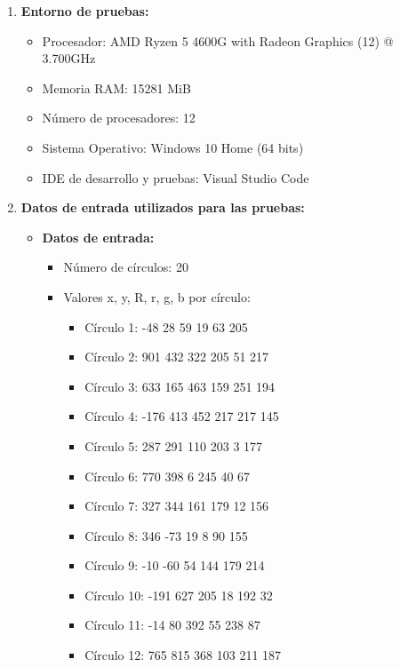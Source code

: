 \documentclass[12pt, letterpaper]{article}
\begin{document}
\begin{flushleft}
\begin{enumerate}
        \vspace{10mm}
        \item \textbf{Entorno de pruebas:}
            \begin{itemize}
                \item Procesador: AMD Ryzen 5 4600G with Radeon Graphics (12) @ 3.700GHz
                \item Memoria RAM: 15281 MiB
                \item Número de procesadores: 12
                \item Sistema Operativo: Windows 10 Home (64 bits)
                \item IDE de desarrollo y pruebas: Visual Studio Code
            \end{itemize}
        \item \textbf{Datos de entrada utilizados para las pruebas:}
            \begin{itemize}
                \item \textbf{Datos de entrada:}
                \begin{itemize}
                    \item Número de círculos: 20
                    \item Valores x, y, R, r, g, b por círculo:
                    \begin{itemize}
                        \item Círculo 1: -48 28 59 19 63 205
                        \item Círculo 2: 901 432 322 205 51 217
                        \item Círculo 3: 633 165 463 159 251 194
                        \item Círculo 4: -176 413 452 217 217 145
                        \item Círculo 5: 287 291 110 203 3 177
                        \item Círculo 6: 770 398 6 245 40 67
                        \item Círculo 7: 327 344 161 179 12 156
                        \item Círculo 8: 346 -73 19 8 90 155
                        \item Círculo 9: -10 -60 54 144 179 214
                        \item Círculo 10: -191 627 205 18 192 32
                        \item Círculo 11: -14 80 392 55 238 87
                        \item Círculo 12: 765 815 368 103 211 187

\end{itemize}
\end{itemize}
\end{itemize}
\end{enumerate}
\end{flushleft}
\end{document}
